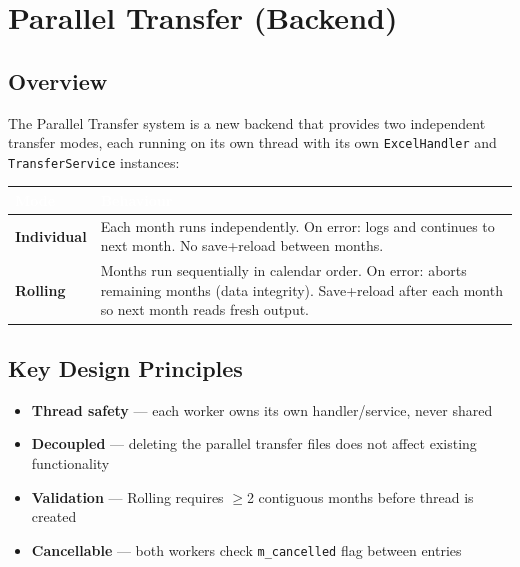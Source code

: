 \documentclass[11pt,a4paper]{article}
\begin{document}
\section{Parallel Transfer (Backend)}

\subsection{Overview}

The Parallel Transfer system is a new backend that provides two independent transfer modes, each running on its own thread with its own \texttt{ExcelHandler} and \texttt{TransferService} instances:

\begin{center}
\begin{tabularx}{0.88\linewidth}{@{} l X @{}}
\toprule
\rowcolor{NewFeature}
\textcolor{White}{\textbf{Mode}} & \textcolor{White}{\textbf{Behaviour}} \\
\midrule
\textbf{Individual} & Each month runs independently. On error: logs and continues to next month. No save+reload between months. \\
\textbf{Rolling}    & Months run sequentially in calendar order. On error: aborts remaining months (data integrity). Save+reload after each month so next month reads fresh output. \\
\bottomrule
\end{tabularx}
\end{center}

\subsection{Key Design Principles}

\begin{itemize}[leftmargin=*, itemsep=4pt]
\item \textbf{Thread safety} --- each worker owns its own handler/service, never shared
\item \textbf{Decoupled} --- deleting the parallel transfer files does not affect existing functionality
\item \textbf{Validation} --- Rolling requires $\geq$2 contiguous months before thread is created
\item \textbf{Cancellable} --- both workers check \texttt{m\_cancelled} flag between entries
\end{itemize}
\end{document}
